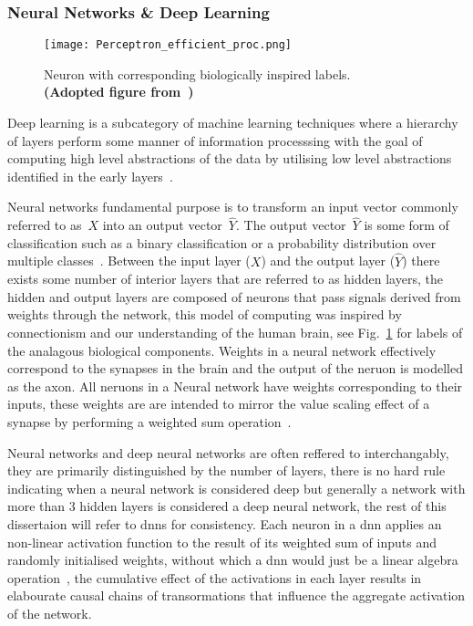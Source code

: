 \documentclass[../../D1.tex]{subfiles}
\begin{document}
\subsubsection{Neural Networks \& Deep Learning}

\begin{figure}[H]
    \texttt{[image: Perceptron\_efficient\_proc.png]}
    \caption{Neuron with corresponding biologically inspired labels.\\ \textbf{(Adopted figure from~\autocite{szeEfficientProcessingDeep2017})}}
    \label{fig:neuronLabeled}
\end{figure}
Deep learning is a subcategory of machine learning techniques where a hierarchy of layers perform some manner of information processsing with the goal of computing high level abstractions of the data by utilising low level abstractions identified in the early layers~\autocite{dengTutorialSurveyArchitectures2014}.


Neural networks fundamental purpose is to transform an input vector commonly referred to as~$X$ into an output vector~$\hat{Y}$. 
The output vector~$\hat{Y}$ is some form of classification such as a binary classification or a probability distribution over multiple classes~\autocite{thierry-miegHowFundamentalConcepts}. 
Between the input layer ($X$) and the output layer ($\hat{Y}$) there exists some number of interior layers that are referred to as hidden layers, the hidden and output layers are composed of neurons that pass signals derived from weights through the network, this model of computing was inspired by connectionism and our understanding of the human brain, see Fig.~\ref{fig:neuronLabeled} for labels of the analagous biological components. 
Weights in a neural network effectively correspond to the synapses in the brain and the output of the neruon is modelled as the axon. 
All neruons in a Neural network have weights corresponding to their inputs, these weights are are intended to mirror the value scaling effect of a synapse by performing a weighted sum operation~\autocite{szeEfficientProcessingDeep2017}.


Neural networks and deep neural networks are often reffered to interchangably, they are primarily distinguished by the number of layers, there is no hard rule indicating when a neural network is considered deep but generally a network with more than 3 hidden layers is considered a deep neural network, the rest of this dissertaion will refer to \acrshort{dnn}s for consistency. 
Each neuron in a \Acrshort{dnn} applies an non-linear activation function to the result of its weighted sum of inputs and randomly initialised weights, without which a \Acrshort{dnn} would just be a linear algebra operation~\autocite{szeEfficientProcessingDeep2017}, the cumulative effect of the activations in each layer results in elabourate causal chains of transormations that influence the aggregate activation of the network.
\end{document}
